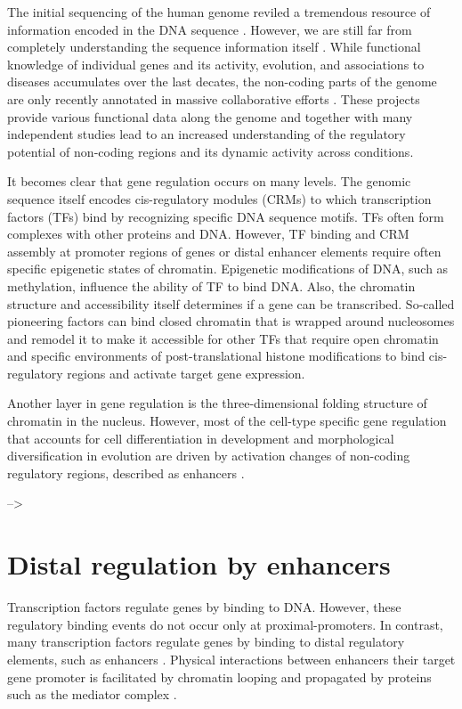 \documentclass[a4paper,twoside=true,openright,parskip=full,chapterprefix=true,11pt,headings=normal,bibliography=totoc,listof=totoc,titlepage=on,captions=tableabove,draft=false]{scrreprt}
\theoremstyle{definition}
\theoremstyle{definition}
\theoremstyle{definition}
\theoremstyle{remark}
\begin{document}
The initial sequencing of the human genome reviled a tremendous resource
of information encoded in the DNA sequence \citep{Lander2001}. However,
we are still far from completely understanding the sequence information
itself \citep{Lander2011}. While functional knowledge of individual
genes and its activity, evolution, and associations to diseases
accumulates over the last decates, the non-coding parts of the genome
are only recently annotated in massive collaborative efforts
\citep{Dunham2012, Kundaje2015, Andersson2014}. These projects provide
various functional data along the genome and together with many
independent studies lead to an increased understanding of the regulatory
potential of non-coding regions and its dynamic activity across
conditions.

It becomes clear that gene regulation occurs on many levels. The genomic
sequence itself encodes cis-regulatory modules (CRMs) to which
transcription factors (TFs) bind by recognizing specific DNA sequence
motifs. TFs often form complexes with other proteins and DNA. However,
TF binding and CRM assembly at promoter regions of genes or distal
enhancer elements require often specific epigenetic states of chromatin.
Epigenetic modifications of DNA, such as methylation, influence the
ability of TF to bind DNA. Also, the chromatin structure and
accessibility itself determines if a gene can be transcribed. So-called
pioneering factors can bind closed chromatin that is wrapped around
nucleosomes and remodel it to make it accessible for other TFs that
require open chromatin and specific environments of post-translational
histone modifications to bind cis-regulatory regions and activate target
gene expression.

Another layer in gene regulation is the three-dimensional folding
structure of chromatin in the nucleus. However, most of the cell-type
specific gene regulation that accounts for cell differentiation in
development and morphological diversification in evolution are driven by
activation changes of non-coding regulatory regions, described as
enhancers \citep{Long2016}.

--\textgreater{}

\hypertarget{distal-regulation-by-enhancers}{%
\section{Distal regulation by
enhancers}\label{distal-regulation-by-enhancers}}

Transcription factors regulate genes by binding to DNA. However, these
regulatory binding events do not occur only at proximal-promoters. In
contrast, many transcription factors regulate genes by binding to distal
regulatory elements, such as enhancers \citep{Spitz2012}. Physical
interactions between enhancers their target gene promoter is facilitated
by chromatin looping and propagated by proteins such as the mediator
complex \citep{Andrey2017}.
\end{document}
